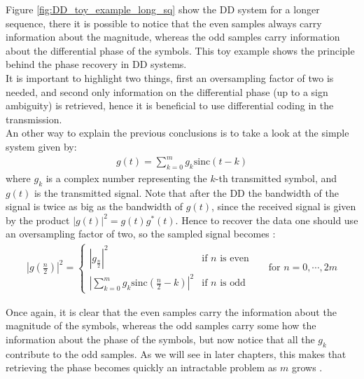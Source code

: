 Figure \ref{fig:DD_toy_example_long_sq} show the DD system for a longer sequence, there it is possible to notice that the even samples always carry information about the magnitude, whereas the odd samples carry information about the differential phase of the symbols. This toy example shows the principle behind the phase recovery in DD systems.\\

It is important to highlight two things, first an oversampling factor of two is needed, and second only information on the differential phase (up to a sign ambiguity) is retrieved, hence it is beneficial to use differential coding in the transmission.\\

An other way to explain the previous conclusions is to take a look at the simple system given by:
\begin{align*}
	g(t)=\sum_{k=0}^m g_k\text{sinc}(t-k)
\end{align*}
where $g_k$ is a complex number representing the $k$-th transmitted symbol, and $g(t)$ is the transmitted signal. Note that after the DD the bandwidth of the signal is twice as big as the bandwidth of $g(t)$, since the received signal is given by the product $|g(t)|^2=g(t)g^*(t)$. Hence to recover the data one should use an oversampling factor of two, so the sampled signal becomes \cite{Tasbihi_Tukey}:
\begin{align*}
	\left|g\left(\frac{n}{2}\right)\right|^2 = \left\{
\begin{array}{ll}
\left|g_{\frac{n}{2}}\right|^2  &  \text{if $n$ is even}  \\
\left|\sum\limits_{k=0}^m g_k\text{sinc}\left(\frac{n}{2}-k\right)\right|^2   & \text{if $n$ is odd}
\end{array}
\right. &&\text{for }n=0,\dotsb,2m
\end{align*}

Once again, it is clear that the even samples carry the information about the magnitude of the symbols, whereas the odd samples carry some how the information about the phase of the symbols, but now notice that all the $g_k$ contribute to the odd samples. As we will see in later chapters, this makes that retrieving the phase becomes quickly an intractable problem as $m$ grows \cite{Tasbihi_Tukey}. 

















